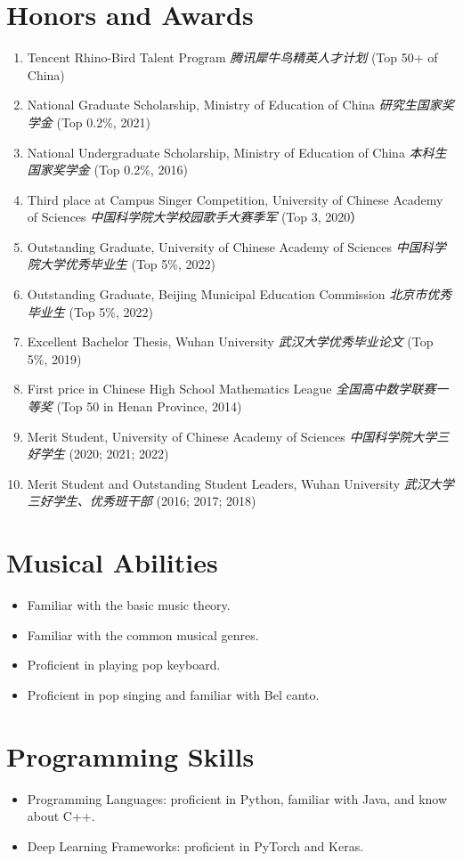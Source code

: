 \documentclass{resume}
\begin{document}
\section{Honors and Awards}
\begin{enumerate}
  \item Tencent Rhino-Bird Talent Program \textit{腾讯犀牛鸟精英人才计划} (Top 50+ of China)
  \item National Graduate Scholarship, Ministry of Education of China \textit{研究生国家奖学金}
        (Top 0.2\%, 2021)
  \item National Undergraduate Scholarship, Ministry of Education of China
        \textit{本科生国家奖学金} (Top 0.2\%, 2016)
  \item Third place at Campus Singer Competition, University of Chinese Academy of
        Sciences \textit{中国科学院大学校园歌手大赛季军} (Top 3, 2020）
  \item Outstanding Graduate, University of Chinese Academy of Sciences
        \textit{中国科学院大学优秀毕业生} (Top 5\%, 2022)
  \item Outstanding Graduate, Beijing Municipal Education Commission \textit{北京市优秀毕业生}
        (Top 5\%, 2022)
  \item Excellent Bachelor Thesis, Wuhan University \textit{武汉大学优秀毕业论文} (Top 5\%, 2019)
  \item First price in Chinese High School Mathematics League \textit{全国高中数学联赛一等奖} (Top
        50 in Henan Province, 2014)
  \item Merit Student, University of Chinese Academy of Sciences \textit{中国科学院大学三好学生}
        (2020; 2021; 2022)
  \item Merit Student and Outstanding Student Leaders, Wuhan University
        \textit{武汉大学三好学生、优秀班干部} (2016; 2017; 2018)
\end{enumerate}

\section{Musical Abilities}
\begin{itemize}
  \item Familiar with the basic music theory.
  \item Familiar with the common musical genres.
  \item Proficient in playing pop keyboard.
  \item Proficient in pop singing and familiar with Bel canto.
\end{itemize}

\section{Programming Skills}
\begin{itemize}
  \item Programming Languages: proficient in Python, familiar with Java, and know about
        C++.
  \item Deep Learning Frameworks: proficient in PyTorch and Keras.
\end{itemize}
\end{document}
